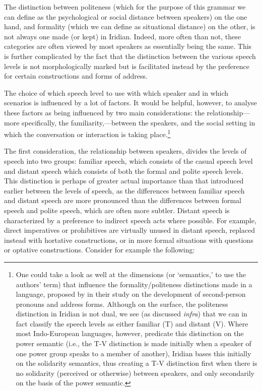 The distinction between politeness (which for the purpose of this grammar we can define as the psychological or social distance between speakers) on the one hand, and formality (which we can define as situational distance) on the other, is not always one made (or kept) in Iridian. Indeed, more often than not, these categories are often viewed by most speakers as essentially being the same. This is further complicated by the fact that the distinction between the various speech levels is not morphologically marked but is facilitated instead by the preference for certain constructions and forms of address.


The choice of which speech level to use with which speaker and in which scenarios is influenced by a lot of factors. It would be helpful, however, to analyse these factors as being influenced by two main considerations: the relationship---more specifically, the familiarity,---between the speakers, and the social setting in which the conversation or interaction is taking place.\footnote{
	One could take a look as well at the dimensions (or `semantics,' to use the authors' term) that influence the formality/politeness distinctions made in a language, proposed by \textcite{browngilman} in their study on the development of second-person pronouns and address forms. Although on the surface, the politeness distinction in Iridian is not dual, we see (as discussed \emph{infra}) that we can in fact classify the speech levels as either familiar (T) and distant (V). Where most Indo-European languages, however, predicate this distinction on the power semantic (i.e., the T-V distinction is made initially when a speaker of one power group speaks to a member of another), Iridian bases this initially on the solidarity semantics, thus creating a T-V distinction first when there is no solidarity (perceived or otherwise) between speakers, and only secondarily on the basis of the power semantic.
}

The first consideration, the relationship between speakers, divides the levels of speech into two groups: {\sc familiar} speech, which consists of the casual speech level and {\sc distant} speech which consists of both the formal and polite speech levels. This distinction is perhaps of greater actual importance than that introduced earlier between the levels of speech, as the differences between familiar speech and distant speech are more pronounced than the differences between formal speech and polite speech, which are often more subtler. Distant speech is characterized by a preference to indirect speech acts where possible. For example, direct imperatives or prohibitives are virtually unused in distant speech, replaced instead with hortative constructions, or in more formal situations with questions or optative constructions. Consider for example the following:

